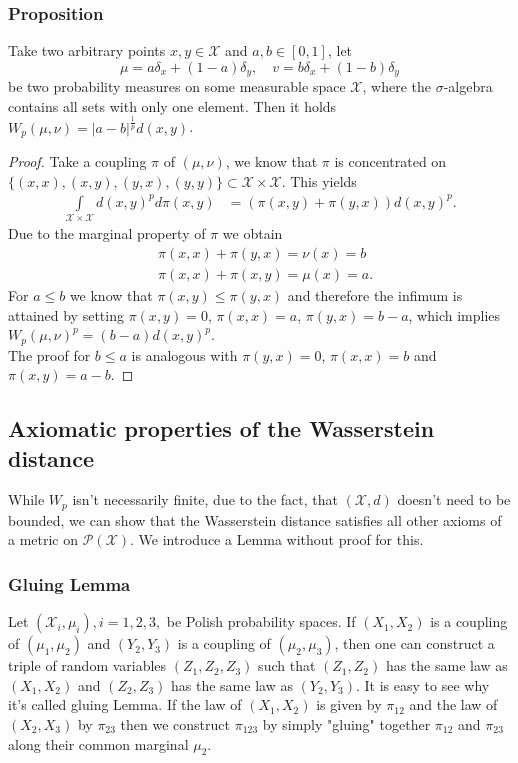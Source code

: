 \documentclass[11pt,a4paper]{article}
\begin{document}
\subsubsection{Proposition}
Take two arbitrary points $x,y\in\mathcal{X}$ and $a,b\in{}[0,1]$, let 
\[
\mu = a\delta_x+(1-a)\delta_y,\quad v=b\delta_x+(1-b)\delta_y
\]
be two probability measures on some measurable space $\mathcal{X}$, where the $\sigma$-algebra contains all sets with only one element. Then it holds $W_p(\mu,\nu) = |a-b|^\frac{1}{p}d(x,y)$.
\begin{proof}
Take a coupling $\pi$ of $(\mu,\nu)$, we know that $\pi$ is concentrated on $\lbrace{}(x,x),(x,y),(y,x),(y,y)\rbrace\subset\mathcal{X\times{}X}$. This yields
\begin{align*}
\int\limits_{\mathcal{X\times{}X}}d(x,y)^pd\pi(x,y) & = \left(\pi(x,y)+\pi(y,x)\right)d(x,y)^p.
\end{align*}
Due to the marginal property of $\pi$ we obtain 
\begin{align*}
&\pi(x,x)+\pi(y,x) = \nu(x) = b \\ &\pi(x,x)+\pi(x,y) = \mu(x) = a.
\end{align*}
For $a\leq{}b$ we know that $\pi(x,y)\leq\pi(y,x)$ and therefore the infimum is attained by setting $\pi(x,y)=0$, $\pi(x,x)=a$, $\pi(y,x)=b-a$, which implies $W_p(\mu,\nu)^p=(b-a)d(x,y)^p$. \vspace{1em}\\The proof for $b\leq{}a$ is analogous with $\pi(y,x)=0$, $\pi(x,x)=b$ and $\pi(x,y)=a-b.$
\end{proof}
\subsection{Axiomatic properties of the Wasserstein distance}
\noindent{}While $W_p$ isn't necessarily finite, due to the fact, that $(\mathcal{X},d)$ doesn't need to be bounded, we can show that the Wasserstein distance satisfies all other axioms of a metric on $\mathcal{P(X)}$.
We introduce a Lemma without proof for this.
\subsubsection{Gluing Lemma}
Let $(\mathcal{X}_i,\mu_i), i = 1, 2, 3,$ be Polish probability spaces. If $(X_1,X_2)$ is a coupling of $(\mu_1,\mu_2)$ and $(Y_2,Y_3)$ is a coupling of $(\mu_2,\mu_3)$, then one can construct a triple of random variables $(Z_1,Z_2,Z_3)$ such that $(Z_1,Z_2)$ has the same law as $(X_1,X_2)$ and $(Z_2,Z_3)$ has the same law as $(Y_2,Y_3).$
It is easy to see why it's called gluing Lemma. If the law of $(X_1,X_2)$ is given by $\pi_{12}$ and the law of $(X_2,X_3)$ by $\pi_{23}$ then we construct $\pi_{123}$ by simply "gluing" together $\pi_{12}$ and $\pi_{23}$ along their common marginal $\mu_2$.
\end{document}
